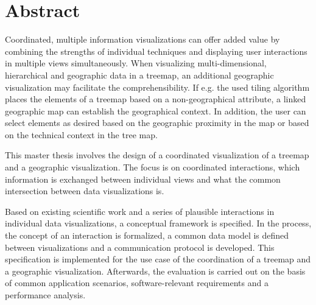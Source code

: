 \chapter*{Abstract}

Coordinated, multiple information visualizations can offer added value by combining the strengths of individual techniques and displaying user interactions in multiple views simultaneously.
When visualizing multi-dimensional, hierarchical and geographic data in a treemap, an additional geographic visualization may facilitate the comprehensibility.
If e.g. the used tiling algorithm places the elements of a treemap based on a non-geographical attribute, a linked geographic map can establish the geographical context.
In addition, the user can select elements as desired based on the geographic proximity in the map or based on the technical context in the tree map.

This master thesis involves the design of a coordinated visualization of a treemap and a geographic visualization.
The focus is on coordinated interactions, which information is exchanged between individual views and what the common intersection between data visualizations is.

Based on existing scientific work and a series of plausible interactions in individual data visualizations, a conceptual framework is specified.
In the process, the concept of an interaction is formalized, a common data model is defined between visualizations and a communication protocol is developed.
This specification is implemented for the use case of the coordination of a treemap and a geographic visualization.
Afterwards, the evaluation is carried out on the basis of common application scenarios, software-relevant requirements and a performance analysis.

